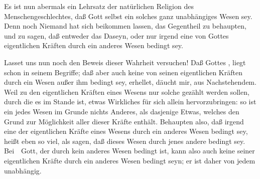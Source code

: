 \begin{aufza}
\item Es ist nun abermals ein Lehrsatz der natürlichen Religion des Menschengeschlechtes, daß Gott selbst ein solches ganz unabhängiges Wesen sey. Denn noch Niemand hat sich beikommen lassen, das Gegentheil zu behaupten, und zu sagen, daß entweder das Daseyn, oder nur irgend eine von Gottes eigentlichen Kräften durch ein anderes Wesen bedingt sey.
\item Lasset uns nun noch den Beweis dieser Wahrheit versuchen! Daß Gottes , liegt schon in seinem Begriffe; daß aber auch keine von seinen eigentlichen Kräften durch ein Wesen außer ihm bedingt sey, erhellet, däucht mir, aus Nachstehendem. Weil zu den eigentlichen Kräften eines Wesens nur solche gezählt werden sollen, durch die es im Stande ist, etwas Wirkliches für sich allein hervorzubringen: so ist ein jedes Wesen im Grunde nichts Anderes, als dasjenige Etwas, welches den Grund zur Möglichkeit aller dieser Kräfte enthält. Behaupten also, daß irgend eine der eigentlichen Kräfte eines Wesens durch ein anderes Wesen bedingt sey, heißt eben so viel, als sagen, daß dieses Wesen  durch jenes andere bedingt sey. Bei~\ Gott, der durch kein anderes Wesen bedingt ist, kann also auch keine seiner eigentlichen Kräfte durch ein anderes Wesen bedingt seyn; er ist daher von jedem unabhängig.
\end{aufza}

